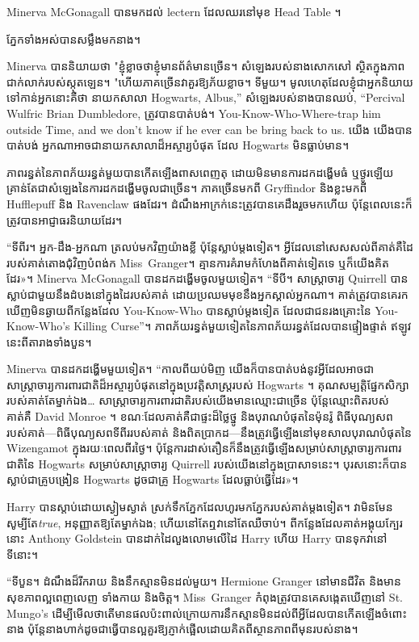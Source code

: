 Minerva McGonagall បានមកដល់ lectern ដែលឈរនៅមុខ Head Table ។

ភ្នែកទាំងអស់បានសម្លឹងមកនាង។

Minerva បាននិយាយថា "ខ្ញុំខ្លាចថាខ្ញុំមានព័ត៌មានច្រើន។ សំឡេងរបស់នាងសោកសៅ ស្ថិតក្នុងភាពជាក់លាក់របស់ស្កុតឡេន។ "ហើយភាគច្រើនវាគួរឱ្យភ័យខ្លាច។ ទីមួយ។ មូលហេតុដែលខ្ញុំជាអ្នកនិយាយទៅកាន់អ្នកនោះគឺថា នាយកសាលា Hogwarts, Albus,” សំឡេងរបស់នាងបានឈប់, “Percival Wulfric Brian Dumbledore, ត្រូវបានបាត់បង់។ You-Know-Who-Where-trap him outside Time, and we don't know if he ever can be bring back to us. យើង យើងបានបាត់បង់ អ្នកណាអាចជានាយកសាលាដ៏អស្ចារ្យបំផុត ដែល Hogwarts មិនធ្លាប់មាន។

ភាពរន្ធត់នៃភាពភ័យរន្ធត់មួយបានកើតឡើងពាសពេញតុ ដោយមិនមានការដកដង្ហើមធំ ឬថ្ងូរឡើយ គ្រាន់តែជាសំឡេងនៃការដកដង្ហើមចូលជាច្រើន។ ភាគច្រើនមកពី Gryffindor និងខ្លះមកពី Hufflepuff និង Ravenclaw ផងដែរ។ ដំណឹង​អាក្រក់​នេះ​ត្រូវ​បាន​គេ​ដឹង​រួច​មក​ហើយ ប៉ុន្តែ​ពេល​នេះ​ក៏​ត្រូវ​បាន​អាជ្ញាធរ​និយាយ​ដែរ។

“ទីពីរ។ អ្នក-ដឹង-អ្នកណា ត្រលប់មកវិញយ៉ាងខ្លី ប៉ុន្តែស្លាប់ម្តងទៀត។ អ្វី​ដែល​នៅ​សេសសល់​ពី​គាត់​គឺ​ដៃ​របស់​គាត់​តោង​ជុំវិញ​បំពង់ក Miss~Granger។ គ្មាន​ការ​គំរាម​កំហែង​ពី​គាត់​ទៀត​ទេ ឬ​ក៏​យើង​គិត​ដែរ»។ Minerva McGonagall បានដកដង្ហើមចូលមួយទៀត។ “ទីបី។ សាស្ត្រាចារ្យ Quirrell បានស្លាប់ជាមួយនឹងដំបងនៅក្នុងដៃរបស់គាត់ ដោយប្រឈមមុខនឹងអ្នកស្គាល់អ្នកណា។ គាត់ត្រូវបានគេរកឃើញមិនឆ្ងាយពីកន្លែងដែល You-Know-Who បានស្លាប់ម្តងទៀត ដែលជាជនរងគ្រោះនៃ You-Know-Who's Killing Curse”។ ភាពភ័យរន្ធត់មួយទៀតនៃភាពភ័យរន្ធត់ដែលបានផ្ទៀងផ្ទាត់ ឥឡូវនេះពីតារាងទាំងបួន។

Minerva បានដកដង្ហើមមួយទៀត។ “កាលពីយប់មិញ យើងក៏បានបាត់បង់នូវអ្វីដែលអាចជាសាស្រ្តាចារ្យការពារជាតិដ៏អស្ចារ្យបំផុតនៅក្នុងប្រវត្តិសាស្រ្តរបស់ Hogwarts ។ គុណសម្បត្តិផ្នែកសិក្សារបស់គាត់តែម្នាក់ឯង… សាស្ត្រាចារ្យការពារជាតិរបស់យើងមានឈ្មោះជាច្រើន ប៉ុន្តែឈ្មោះពិតរបស់គាត់គឺ David Monroe ។ ខណៈដែលគាត់គឺជាផ្ទះដ៏ថ្លៃថ្នូ និងបុរាណបំផុតនៃម៉ុនរ៉ូ ពិធីបុណ្យសពរបស់គាត់—ពិធីបុណ្យសពទីពីររបស់គាត់ និងពិតប្រាកដ—នឹងត្រូវធ្វើឡើងនៅមុខសាលបុរាណបំផុតនៃ Wizengamot ក្នុងរយៈពេលពីរថ្ងៃ។ ប៉ុន្តែការដាស់តឿនក៏នឹងត្រូវធ្វើឡើងសម្រាប់សាស្រ្តាចារ្យការពារជាតិនៃ Hogwarts សម្រាប់សាស្រ្តាចារ្យ Quirrell របស់យើងនៅក្នុងប្រាសាទនេះ។ បុរស​នោះ​ក៏​បាន​ស្លាប់​ជា​គ្រូ​បង្រៀន Hogwarts ដូច​ជា​គ្រូ​ Hogwarts ដែល​ធ្លាប់​ធ្វើ​ដែរ»។

Harry បានស្តាប់ដោយស្ងៀមស្ងាត់ ស្រក់ទឹកភ្នែកដែលហូរមកភ្នែករបស់គាត់ម្តងទៀត។ វាមិនមែនសូម្បីតែ\emph{true}, អនុញ្ញាតឱ្យតែម្នាក់ឯង; ហើយនៅតែឮវានៅតែឈឺចាប់។ ពីកន្លែងដែលគាត់អង្គុយក្បែរនោះ Anthony Goldstein បានដាក់ដៃលួងលោមលើដៃ Harry ហើយ Harry បានទុកវានៅទីនោះ។

“ទីបួន។ ដំណឹងដ៏រីករាយ និងនឹកស្មានមិនដល់មួយ។ Hermione Granger នៅមានជីវិត និងមានសុខភាពល្អពេញលេញ ទាំងកាយ និងចិត្ត។ Miss~Granger កំពុងត្រូវបានគេសង្កេតឃើញនៅ St. Mungo's ដើម្បីមើលថាតើមានផលប៉ះពាល់ក្រោយការនឹកស្មានមិនដល់ពីអ្វីដែលបានកើតឡើងចំពោះនាង ប៉ុន្តែនាងហាក់ដូចជាធ្វើបានល្អគួរឱ្យភ្ញាក់ផ្អើលដោយគិតពីស្ថានភាពពីមុនរបស់នាង។

